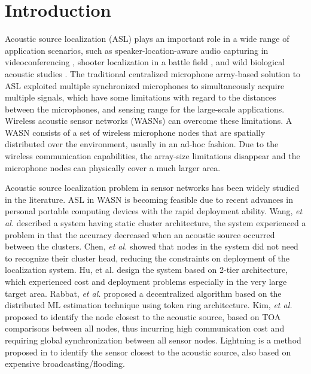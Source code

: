 
\section{Introduction}

Acoustic source localization (ASL) plays an important role in a wide range of application scenarios, such
as speaker-location-aware audio capturing in videoconferencing \cite{guo2011localising}, shooter localization in a battle field \cite{sallai2011acoustic}, and wild biological acoustic studies \cite{allen2008voxnet}. 
The traditional centralized microphone array-based solution to ASL exploited multiple synchronized microphones to simultaneously acquire multiple signals, 
which have some limitations with regard to the distances between the microphones, and sensing range for the large-scale applications.
Wireless acoustic sensor networks (WASNs) can overcome these limitations. 
A WASN consists of a set of wireless microphone nodes that are spatially distributed over the environment, usually in an ad-hoc fashion. 
Due to the wireless communication capabilities, the array-size limitations disappear and the microphone nodes can physically cover a much larger area. 

Acoustic source localization problem in sensor networks has been widely studied in the literature. 
ASL in WASN is becoming feasible due to recent advances in personal portable computing devices with the rapid deployment ability.
Wang, \emph{et al.} \cite{wang2003acoustic} described a system having static cluster architecture, the system experienced a problem in that the accuracy decreased when an acoustic source occurred between the clusters.
Chen, \emph{et al.} \cite{chen2004dynamic} showed that nodes in the system did not need to recognize their cluster head, reducing the constraints on deployment of the localization system.
Hu, et al. \cite{hu2009design} design the system based on 2-tier architecture, which experienced cost and deployment problems especially in the very large target area.
Rabbat, \emph{et al.} \cite{rabbat2005robust} proposed a decentralized algorithm based on the distributed ML estimation technique using token ring architecture.
Kim, \emph{et al.} \cite{kim2009locating} proposed to identify the node closest to the acoustic source, based on TOA comparisons between all nodes, thus incurring high communication cost and requiring global synchronization between all sensor nodes.
Lightning is a method proposed in \cite{wang2008lightning} to identify the sensor closest to the acoustic source, also based on expensive broadcasting/flooding.


